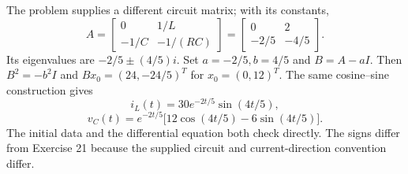 The problem supplies a different circuit matrix; with its constants,
\[A=\begin{bmatrix}0&1/L\\-1/C&-1/(RC)\end{bmatrix}
=\begin{bmatrix}0&2\\-2/5&-4/5\end{bmatrix}.\]
Its eigenvalues are $-2/5\pm(4/5)i$. Set $a=-2/5,b=4/5$ and
$B=A-aI$. Then $B^2=-b^2I$ and $Bx_0=(24,-24/5)^T$ for
$x_0=(0,12)^T$. The same cosine--sine construction gives
\[i_L(t)=30e^{-2t/5}\sin(4t/5),\]
\[v_C(t)=e^{-2t/5}\bigl[12\cos(4t/5)-6\sin(4t/5)\bigr].\]
The initial data and the differential equation both check directly.
The signs differ from Exercise 21 because the supplied circuit
and current-direction convention differ.
